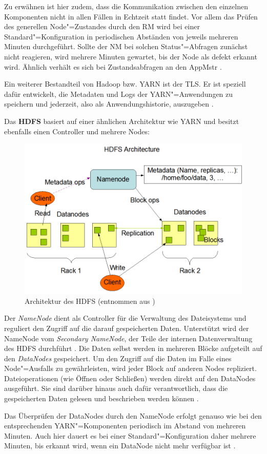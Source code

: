 Zu erwähnen ist hier zudem, dass die Kommunikation zwischen den einzelnen Komponenten nicht in allen Fällen in Echtzeit statt findet.
Vor allem das Prüfen des generellen Node"=Zustandes durch den \ac{RM} wird bei einer Standard"=Konfiguration in periodischen Abständen von jeweils mehreren Minuten durchgeführt.
Sollte der \ac{NM} bei solchen Status"=Abfragen zunächst nicht reagieren, wird mehrere Minuten gewartet, bis der Node als defekt erkannt wird.
Ähnlich verhält es sich bei Zustandsabfragen an den \ac{AppMstr} \cite{HadoopYarnConfig271}.

Ein weiterer Bestandteil von Hadoop bzw. \ac{YARN} ist der \ac{TLS}.
Er ist speziell dafür entwickelt, die Metadaten und Logs der \ac{YARN}"=Anwendungen zu speichern und jederzeit, also als Anwendungshistorie, auszugeben \cite{HadoopYarnTlServer271}.

Das \textbf{\ac{HDFS}} basiert auf einer ähnlichen Architektur wie \ac{YARN} und besitzt ebenfalls einen Controller und mehrere Nodes:

\begin{figure}[h]
    \includegraphics{./resources/hdfsarchitecture.png}
    \caption[Architektur des HDFS]
    {Architektur des \acs{HDFS} (entnommen aus \cite{HadoopHdfsDesc271})}
    \label{fig:hdfsarch}
\end{figure}

Der \emph{NameNode} dient als Controller für die Verwaltung des Dateisystems und reguliert den Zugriff auf die darauf gespeicherten Daten.
Unterstützt wird der NameNode vom \emph{Secondary NameNode}, der Teile der internen Datenverwaltung des \ac{HDFS} durchführt \cite{HadoopHdfsGuide271}.
Die Daten selbst werden in mehreren Blöcke aufgeteilt auf den \emph{DataNodes} gespeichert.
Um den Zugriff auf die Daten im Falle eines Node"=Ausfalls zu gewährleisten, wird jeder Block auf anderen Nodes repliziert.
Dateioperationen (wie Öffnen oder Schließen) werden direkt auf den DataNodes ausgeführt.
Sie sind darüber hinaus auch dafür verantwortlich, dass die gespeicherten Daten gelesen und beschrieben werden können \cite{HadoopHdfsDesc271}.

Das Überprüfen der DataNodes durch den NameNode erfolgt genauso wie bei den entsprechenden \ac{YARN}"=Komponenten periodisch im Abstand von mehreren Minuten.
Auch hier dauert es bei einer Standard"=Konfiguration daher mehrere Minuten, bis erkannt wird, wenn ein DataNode nicht mehr verfügbar ist \cite{HadoopHdfsConfig271}.
